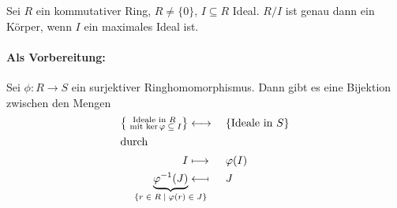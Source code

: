 \documentclass[12pt,a4paper]{scrartcl}
\begin{document}
\begin{satz} \label{thm:field_max_ideal}
	Sei $R$ ein kommutativer Ring, $R \neq\{0\}$, $I\subseteq R$ Ideal. $R/I$ ist genau dann ein Körper, wenn $I$ ein maximales Ideal ist.
\end{satz}

\paragraph{Als Vorbereitung:}

\begin{satz} \label{thm:ideal_bij}
	Sei $\phi\colon R\to S$ ein surjektiver Ringhomomorphismus. Dann gibt es eine Bijektion zwischen den Mengen
	\begin{alignat*}{2}
		\left\{\substack{\text{Ideale in $R$}\\\text{ mit $\ker \phi\subseteq I$} }\right\}&\longleftrightarrow \; &&\{\text{Ideale in $S$}\} \\\intertext{durch}
		I & \longmapsto &&\phi(I)\\
		\underbrace{\phi^{-1}(J)}_{\mathclap{\text{$\{r\in R\mid\phi(r) \in J\}$}}} & \longmapsfrom && J
	\end{alignat*}
\end{satz}
\end{document}

